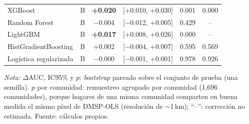\begin{table}[H]
\begin{tabular}{llcccc}
    \addlinespace
    XGBoost                  & B & \textbf{+0.020} & [+0.010, +0.030] & 0.001 & 0.000 \\
    Random Forest            & B & $-$0.004 & [$-$0.012, +0.005] & 0.429 & -- \\
    LightGBM                 & B & \textbf{+0.017} & [+0.008, +0.026] & 0.000 & -- \\
    HistGradientBoosting     & B & +0.002 & [$-$0.004, +0.007] & 0.595 & 0.569 \\
    Logística regularizada   & B & $-$0.000 & [$-$0.001, +0.001] & 0.978 & 0.926 \\
    \bottomrule
  \end{tabular}
  \begin{minipage}{0.95\textwidth}
    \vspace{4pt}
    \footnotesize \textit{Nota:} $\Delta$AUC, IC95\% y $p$: \emph{bootstrap} pareado sobre el
    conjunto de prueba (una semilla). $p$ por comunidad:
    remuestreo agrupado por comunidad (1{,}696 comunidades),
    porque hogares de una misma comunidad comparten en buena medida el
    mismo píxel de DMSP-OLS (resolución de $\sim$1\,km); ``--'':
    corrección no estimada. Fuente: cálculos propios.
  \end{minipage}
\end{table}